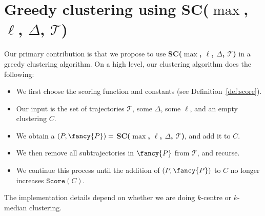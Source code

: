 \section{\texorpdfstring{Greedy clustering using SC($\max$, $\ell$, $\Delta$, $\mathcal{T}$)}{Greedy clustering using SC(max, l, D, T)}}
\label{sec:clustering}
%
Our primary contribution is that we propose to use \textbf{SC($\max$, $\ell$, $\Delta$, $\mathcal{T}$)} in a greedy clustering algorithm. 
On a high level, our clustering algorithm does the following:
%
\begin{itemize}
    \item We first choose the scoring function and constants (see Definition~\ref{def:score}).
    \item    Our input is the set of trajectories $\mathcal{T}$, some $\Delta$, some $\ell$, and an empty clustering $C$. 
    \item 
We obtain a \pathlet $(P, {\fancy{P}}) =$ \textbf{SC($\max$, $\ell$, $\Delta$, $\mathcal{T}$)}, and add it to $C$.
\item 
  We then remove all subtrajectories in ${\fancy{P}}$  from $\mathcal{T}$, and recurse. 
  \item 
We continue this process until the addition of $(P, {\fancy{P}})$ to $C$ no longer increases $\texttt{Score}(C)$.
\end{itemize}
%
%
\noindent
The implementation details depend on whether we are doing $k$-centre or $k$-median clustering. 
%
%
%
